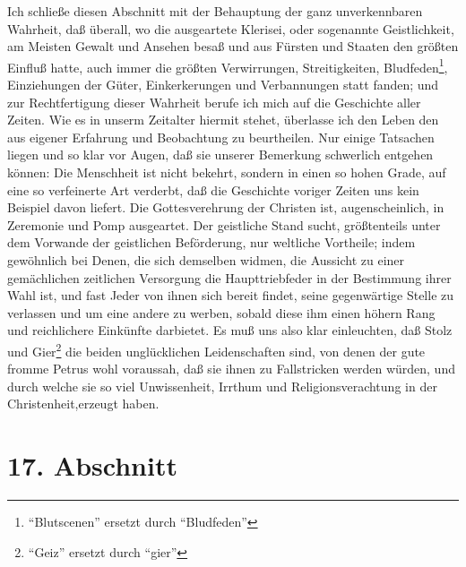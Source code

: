 Ich schließe diesen Abschnitt mit der Behauptung der ganz unverkennbaren
Wahrheit, daß überall, wo die ausgeartete Klerisei, oder sogenannte
Geistlichkeit, am Meisten Gewalt und Ansehen besaß und aus Fürsten und
Staaten den größten Einfluß hatte, auch immer die größten Verwirrungen,
Streitigkeiten, Bludfeden\footnote{"`Blutscenen"' ersetzt durch "`Bludfeden"'}, Einziehungen der Güter, Einkerkerungen und
Verbannungen statt fanden; und zur Rechtfertigung dieser Wahrheit berufe ich
mich auf die Geschichte aller Zeiten. Wie es in unserm Zeitalter hiermit stehet,
überlasse ich den Leben den aus eigener Erfahrung und Beobachtung zu
beurtheilen. Nur einige Tatsachen liegen und so klar vor Augen, daß sie unserer
Bemerkung schwerlich entgehen können: Die Menschheit ist nicht bekehrt, sondern
in einen so hohen Grade, auf eine so verfeinerte Art verderbt, daß die
Geschichte voriger Zeiten uns kein Beispiel davon liefert. Die Gottesverehrung
der Christen ist, augenscheinlich, in Zeremonie und Pomp ausgeartet. Der
geistliche Stand sucht, größtenteils unter dem Vorwande der geistlichen
Beförderung, nur weltliche Vortheile; indem gewöhnlich bei Denen, die sich
demselben widmen, die Aussicht zu einer gemächlichen zeitlichen Versorgung die
Haupttriebfeder in der Bestimmung ihrer Wahl ist, und fast Jeder von ihnen sich
bereit findet, seine gegenwärtige Stelle zu verlassen und um eine andere zu
werben, sobald diese ihm einen höhern Rang und reichlichere Einkünfte darbietet.
Es muß uns also klar einleuchten, daß Stolz und Gier\footnote{"`Geiz"' ersetzt durch "`gier"'} die beiden unglücklichen
Leidenschaften sind, von denen der gute fromme Petrus wohl voraussah, daß sie
ihnen zu Fallstricken werden würden, und durch welche sie so viel Unwissenheit,
Irrthum und Religionsverachtung in der Christenheit,erzeugt haben.

\section{17. Abschnitt} \label{kap7_ab17}

